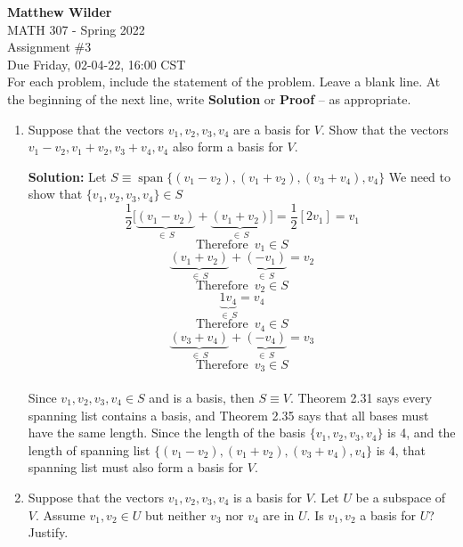 \documentclass[12pt]{article}
\newcommand{\brac}[1]{\left[ {#1} \right] }
\renewcommand{\over}[1]{\frac{1}{{#1}}}
\begin{document}
\pagestyle{fancy}
\fancyhf{}

\noindent \textbf{Matthew Wilder}\\MATH 307 - Spring 2022 \\
Assignment \#3 \\
Due Friday, 02-04-22, 16:00 CST \\

For each problem, include the statement of the problem. Leave a blank line.  At the beginning of the next line, write \textbf{Solution} or \textbf{Proof} -- as appropriate.

\begin{enumerate}
\item  Suppose that the vectors $v_1, v_2, v_3, v_4$ are a basis for $V$.  Show that the vectors \\
    $v_1-v_2, v_1+v_2, v_3+v_4, v_4$ also form a basis for $V$.
\begin{mybox}
    \textbf{Solution:}
    Let $S \equiv \operatorname{span}\{(v_1-v_2), (v_1+v_2), (v_3+v_4), v_4\}$ We need to show that $\{v_1, v_2, v_3, v_4\} \in S$
    $$\over{2} \Big[ \underbrace{(v_1-v_2)}_{\in\,S} + \underbrace{(v_1 + v_2)}_{\in\,S}\Big] = \over{2}\brac{2v_1} = v_1$$
        $$\text{Therefore } \, v_1 \in S$$
        \vspace{0.3in}
    $$\underbrace{(v_1+v_2)}_{\in\,S} + \underbrace{(-v_1)}_{\in\, S} = v_2$$
                $$\text{Therefore } \, v_2 \in S$$\vspace{0.3in}
        $$\underbrace{1v_4}_{\in\,S} = v_4$$$$\text{Therefore }\, v_4 \in S$$\vspace{0.3in}
        $$\underbrace{(v_3 + v_4)}_{\in\,S} + \underbrace{(-v_4)}_{\in\, S} = v_3$$
        $$\text{Therefore }\, v_3 \in S$$\vspace{0.2in}\\
        Since $v_1, v_2, v_3, v_4 \in S$ and is a basis, then $S \equiv V$. Theorem 2.31 says every spanning list contains a basis, and Theorem 2.35 says that all bases must have the same length. Since the length of the basis $\{v_1, v_2, v_3, v_4\}$ is 4, and the length of spanning list $\{(v_1-v_2), (v_1+v_2), (v_3+v_4), v_4\}$ is 4, that spanning list must also form a basis for $V$.
\end{mybox}
\newpage
\item   Suppose that the vectors $v_1, v_2, v_3, v_4$ is a basis for $V$.  Let $U$ be a subspace of $V$.  Assume $v_1, v_2 \in U$ but neither $v_3$ nor $v_4$ are in $U$.  Is $v_1, v_2$ a basis for $U$?  Justify.

\end{enumerate}
\end{document}
